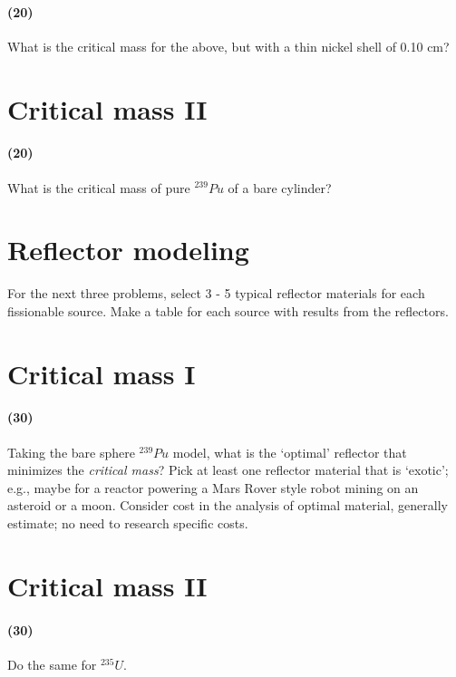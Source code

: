 \documentclass[11pt,a4paper]{article}
\begin{document}
\paragraph*{(20)}
What is the critical mass for the above, but with a thin nickel shell of 0.10 cm?





\newpage

\section{Critical mass II}
\paragraph*{(20)}
What is the critical mass of pure $^{239}Pu$ of a bare cylinder?





\newpage

\section*{Reflector modeling}
For the next three problems, select 3 - 5 typical reflector materials for each fissionable source. Make a table for each source with results from the reflectors.

\newpage

\section{Critical mass I}
\paragraph*{(30)}
Taking the bare sphere $^{239}Pu$ model, what is the `optimal' reflector that minimizes the \textit{critical mass}? Pick at least one reflector material that is `exotic'; e.g., maybe for a reactor powering a Mars Rover style robot mining on an asteroid or a moon. Consider cost in the analysis of optimal material, generally estimate; no need to research specific costs. 





\newpage

\section{Critical mass II}
\paragraph*{(30)}
Do the same for $^{235}U$.
\end{document}
